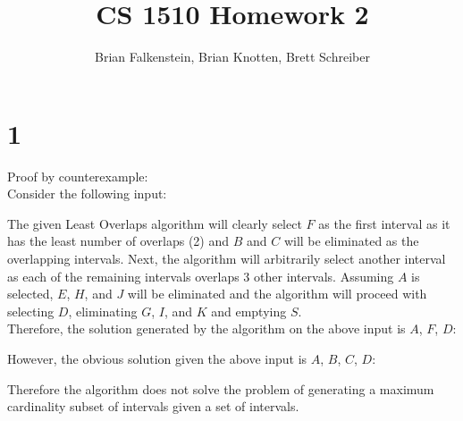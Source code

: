 \documentclass[letterpaper,notitlepage,twoside]{article}
\title{CS 1510 Homework 2}
\author{Brian Falkenstein, Brian Knotten, Brett Schreiber}
\begin{document}
\maketitle

\section*{1}
Proof by counterexample: \\
Consider the following input: 
\begin{center}
\end{center}
The given Least Overlaps algorithm will clearly select $F$ as the first interval as it has the least number of overlaps (2) and $B$ and $C$ will be eliminated as the overlapping intervals. Next, the algorithm will arbitrarily select another interval as each of the remaining intervals overlaps 3 other intervals. Assuming $A$ is selected, $E$, $H$, and $J$ will be eliminated and the algorithm will proceed with selecting $D$, eliminating $G$, $I$, and $K$ and emptying $S$.\\
Therefore, the solution generated by the algorithm on the above input is $A$, $F$, $D$:
\begin{center}
\end{center}
However, the obvious solution given the above input is $A$, $B$, $C$, $D$:
\begin{center}
\end{center}
Therefore the algorithm does not solve the problem of generating a maximum cardinality subset of intervals given a set of intervals.
\end{document}
